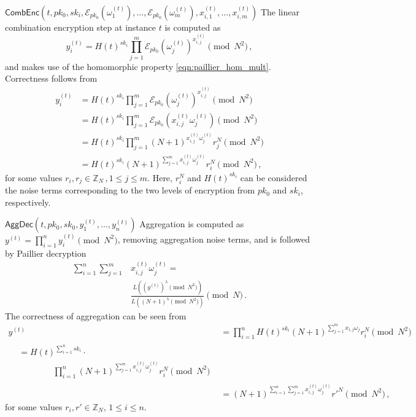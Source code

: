 \documentclass[10pt,journal,compsoc]{IEEEtran}
\theoremstyle{definition}
\theoremstyle{definition}
\theoremstyle{remark}
\begin{document}
\begin{LaTeXdescription}
    \item[$\mathsf{CombEnc}(t, pk_0, sk_i, \mathcal{E}_{pk_0}(\omega_1^{(t)}),\dots,\mathcal{E}_{pk_0}(\omega_m^{(t)}), x^{(t)}_{i,1},\dots,x^{(t)}_{i,m})$] The linear combination encryption step at instance $t$ is computed as 
    \begin{equation}
        y^{(t)}_i = H(t)^{sk_i}\prod^{m}_{j=1}\mathcal{E}_{pk_0}(\omega^{(t)}_j)^{x^{(t)}_{i,j}} \pmod{N^2}\,,\label{eqn:our_scheme_lin_comb}
    \end{equation}
    and makes use of the homomorphic property \eqref{eqn:paillier_hom_mult}. Correctness follows from
    \begin{equation*}
        \begin{split}
             y^{(t)}_i &= H(t)^{sk_i}\prod^{m}_{j=1}\mathcal{E}_{pk_0}(\omega^{(t)}_j)^{x^{(t)}_{i,j}} \pmod{N^2} \\
            &= H(t)^{sk_i}\prod^{m}_{j=1}\mathcal{E}_{pk_0}(x^{(t)}_{i,j}\omega^{(t)}_j) \pmod{N^2} \\
            &= H(t)^{sk_i}\prod^{m}_{j=1}(N+1)^{x^{(t)}_{i,j}\omega^{(t)}_j} r^{N}_{j} \pmod{N^2} \\
            &= H(t)^{sk_i}(N+1)^{\sum^{m}_{j=1}x^{(t)}_{i,j}\omega^{(t)}_j} r_{i}^{N} \pmod{N^2}\,,
        \end{split}
    \end{equation*}
    for some values $r_i,r_j \in \mathbb{Z}_N\,,1\leq j \leq m$. Here, $r_i^N$ and $H(t)^{sk_i}$ can be considered the noise terms corresponding to the two levels of encryption from $pk_0$ and $sk_i$, respectively.

    \item[$\mathsf{AggDec}(t, pk_0, sk_0, y^{(t)}_1,\dots,y^{(t)}_n)$] Aggregation is computed as $y^{(t)} = \prod^n_{i=1}y^{(t)}_i \pmod{N^2}$, removing aggregation noise terms, and is followed by Paillier decryption
    \begin{equation}
        \begin{split}
            \sum^{n}_{i=1}\sum^{m}_{j=1}&x^{(t)}_{i,j}\omega^{(t)}_j =\\
            &\frac{L((y^{(t)})^\lambda\pmod{N^2})}{L((N+1)^\lambda\pmod{N^2})} \pmod{N}\,.
        \end{split} \label{eqn:our_scheme_decrypt}
    \end{equation}
    The correctness of aggregation can be seen from
    \begin{align*}
        y^{(t)} &= \prod^n_{i=1}H(t)^{sk_i}(N+1)^{\sum^{m}_{j=1}x_{i,j}\omega_j}r_i^N \pmod{N^2} \\
        \begin{split}
            &= H(t)^{\sum^n_{i=1}sk_i}\cdot \\
            &\qquad\qquad \prod^n_{i=1}(N+1)^{\sum^{m}_{j=1}x^{(t)}_{i,j}\omega^{(t)}_j}r_i^N \pmod{N^2}
        \end{split}\\
        &= (N+1)^{\sum^n_{i=1}\sum^{m}_{j=1}x^{(t)}_{i,j}\omega^{(t)}_j}r'^N \pmod{N^2}\,,
    \end{align*}
    for some values $r_i,r' \in \mathbb{Z}_N,\,1\leq i \leq n$.
\end{LaTeXdescription}
\end{document}
